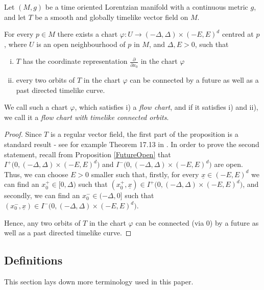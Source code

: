 \documentclass[reqno]{article}
\newcommand{\ux}{\underline{x}}
\begin{document}
\begin{proposition}\label{schwprop:FlowChart}
\label{FlowChart}
Let $(M,g)$ be a time oriented Lorentzian manifold with a continuous metric $g$, and let $T$ be a smooth and globally timelike vector field on $M$. 

For every $p \in M$ there exists a chart $\varphi : U \to (-\Delta, \Delta) \times (-E, E)^d$ centred at $p$, where $U$ is an open neighbourhood of $p$ in $M$, and $\Delta, E >0$, such that
\begin{enumerate}[i)]
\item $T$ has the coordinate representation $\frac{\partial}{\partial x_0}$ in the chart $\varphi$
\item every two orbits of $T$ in the chart $\varphi$ can be connected by a future as well as a past directed timelike curve.
\end{enumerate}
We call such a chart $\varphi$, which satisfies i) a \emph{flow chart}, and if it satisfies i) and ii), we call it a \emph{flow chart with timelike connected orbits}.
\end{proposition}

\begin{proof}
Since $T$ is a regular vector field, the first part of the proposition is a standard result - see for example Theorem 17.13 in \cite{LeeSmooth}. In order to prove the second statement, recall from Proposition \ref{FutureOpen} that $I^+\big(0, (-\Delta, \Delta) \times (-E, E)^d\big)$ and $I^-\big(0,  (-\Delta, \Delta) \times (-E, E)^d\big)$ are open. Thus, we can choose $E>0$ smaller such that, firstly, for every $\ux \in  (-E, E)^d$ we can find an $x_0^+ \in [0,\Delta)$ such that $(x_0^+, \ux) \in I^+\big(0, (-\Delta, \Delta) \times (-E, E)^d\big)$, and secondly, we can find an $x_0^- \in (-\Delta ,0]$ such that $(x_0^-, \ux) \in I^-\big(0,  (-\Delta, \Delta) \times (-E, E)^d\big)$. 
\begin{center}
\def\svgwidth{7cm}

\end{center} 
Hence, any two orbits of $T$ in the chart $\varphi$ can be connected (via $0$) by a future as well as a past directed timelike curve. 
\end{proof}



\subsection{Definitions}

This section lays down more terminology used in this paper.
\end{document}
